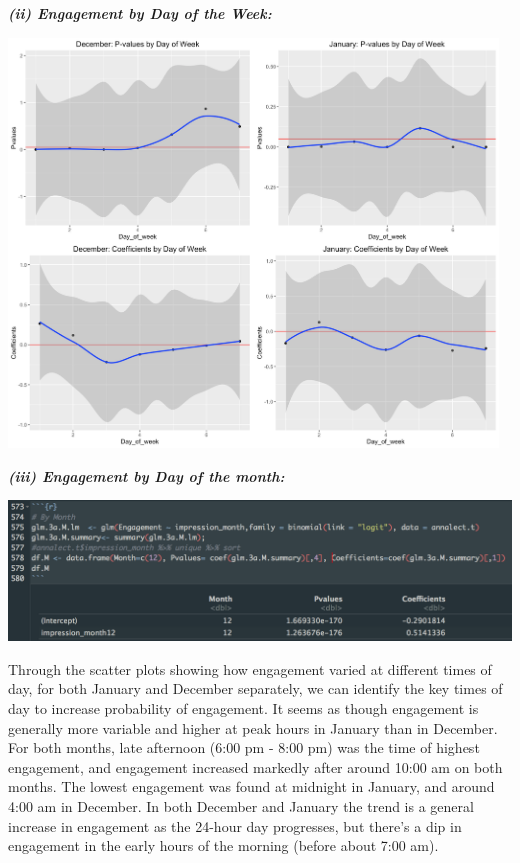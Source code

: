 \documentclass[10pt, oneside,spanish]{article}
\begin{document}
\textbf{\textit{(ii) Engagement by Day of the Week:}}
\begin{center}
\includegraphics[width=13cm]{dow.png}
\end{center}

\textbf{\textit{(iii) Engagement by Day of the month:}}
\begin{center}
\includegraphics[width=13.5cm]{month.png}
\end{center}


Through the scatter plots showing how engagement varied at different times of day, for both January and December separately, we can identify the key times of day to increase probability of engagement. It seems as though engagement is generally more variable and higher at peak hours in January than in December.  For both months, late afternoon (6:00 pm - 8:00 pm) was the time of highest engagement, and engagement increased markedly after around 10:00 am on both months.  The lowest engagement was found at midnight in January, and around 4:00 am in December.  In both December and January the trend is a general increase in engagement as the 24-hour day progresses, but there's a dip in engagement  in the early hours of the morning (before about 7:00 am).
\end{document}
